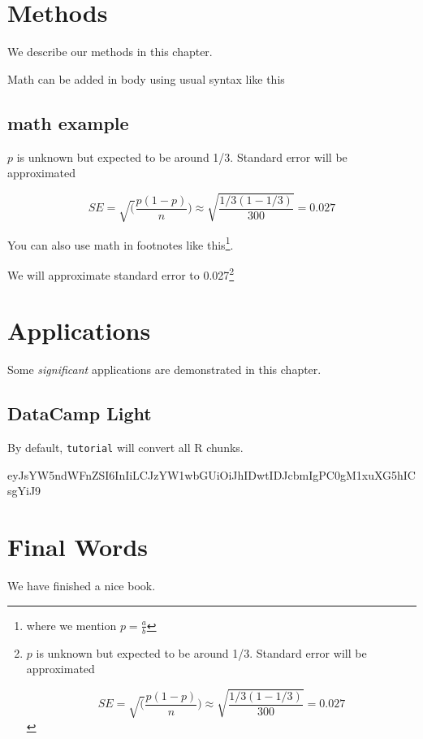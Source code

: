 \documentclass[
]{book}
\theoremstyle{definition}
\theoremstyle{definition}
\theoremstyle{definition}
\theoremstyle{definition}
\theoremstyle{remark}
\begin{document}
\hypertarget{methods}{%
\chapter{Methods}\label{methods}}

We describe our methods in this chapter.

Math can be added in body using usual syntax like this

\hypertarget{math-example}{%
\section{math example}\label{math-example}}

\(p\) is unknown but expected to be around 1/3. Standard error will be approximated

\[
SE = \sqrt(\frac{p(1-p)}{n}) \approx \sqrt{\frac{1/3 (1 - 1/3)} {300}} = 0.027
\]

You can also use math in footnotes like this\footnote{where we mention \(p = \frac{a}{b}\)}.

We will approximate standard error to 0.027\footnote{\(p\) is unknown but expected to be around 1/3. Standard error will be approximated

  \[
  SE = \sqrt(\frac{p(1-p)}{n}) \approx \sqrt{\frac{1/3 (1 - 1/3)} {300}} = 0.027
  \]}

\hypertarget{applications}{%
\chapter{Applications}\label{applications}}

Some \emph{significant} applications are demonstrated in this chapter.

\hypertarget{datacamp-light}{%
\section{DataCamp Light}\label{datacamp-light}}

By default, \texttt{tutorial} will convert all R chunks.

eyJsYW5ndWFnZSI6InIiLCJzYW1wbGUiOiJhIDwtIDJcbmIgPC0gM1xuXG5hICsgYiJ9

\hypertarget{final-words}{%
\chapter{Final Words}\label{final-words}}

We have finished a nice book.

  
\end{document}
